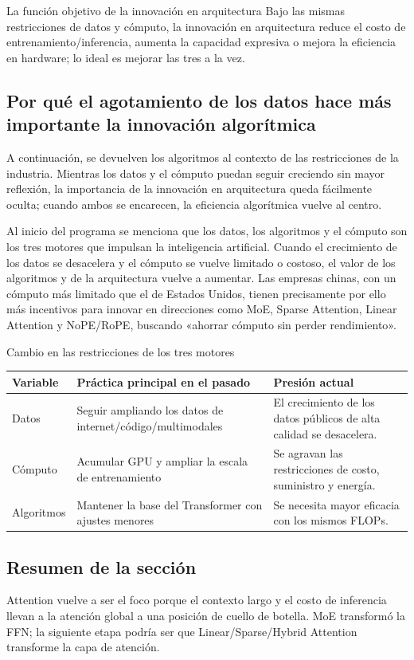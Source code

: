 \begin{importantbox}{La función objetivo de la innovación en arquitectura}
Bajo las mismas restricciones de datos y cómputo, la innovación en arquitectura reduce el costo de entrenamiento/inferencia, aumenta la capacidad expresiva o mejora la eficiencia en hardware; lo ideal es mejorar las tres a la vez.
\end{importantbox}

\subsection{Por qué el agotamiento de los datos hace más importante la innovación algorítmica}

A continuación, se devuelven los algoritmos al contexto de las restricciones de la industria. Mientras los datos y el cómputo puedan seguir creciendo sin mayor reflexión, la importancia de la innovación en arquitectura queda fácilmente oculta; cuando ambos se encarecen, la eficiencia algorítmica vuelve al centro.

Al inicio del programa se menciona que los datos, los algoritmos y el cómputo son los tres motores que impulsan la inteligencia artificial. Cuando el crecimiento de los datos se desacelera y el cómputo se vuelve limitado o costoso, el valor de los algoritmos y de la arquitectura vuelve a aumentar. Las empresas chinas, con un cómputo más limitado que el de Estados Unidos, tienen precisamente por ello más incentivos para innovar en direcciones como MoE, Sparse Attention, Linear Attention y NoPE/RoPE, buscando «ahorrar cómputo sin perder rendimiento».

\begin{knowledgebox}{Cambio en las restricciones de los tres motores}
\begin{tabularx}{\textwidth}{p{}p{}X}
\toprule
Variable & Práctica principal en el pasado & Presión actual \\
\midrule
Datos & Seguir ampliando los datos de internet/código/multimodales & El crecimiento de los datos públicos de alta calidad se desacelera. \\
Cómputo & Acumular GPU y ampliar la escala de entrenamiento & Se agravan las restricciones de costo, suministro y energía. \\
Algoritmos & Mantener la base del Transformer con ajustes menores & Se necesita mayor eficacia con los mismos FLOPs. \\
\bottomrule
\end{tabularx}
\end{knowledgebox}

\subsection{Resumen de la sección}

Attention vuelve a ser el foco porque el contexto largo y el costo de inferencia llevan a la atención global a una posición de cuello de botella. MoE transformó la FFN; la siguiente etapa podría ser que Linear/Sparse/Hybrid Attention transforme la capa de atención.
